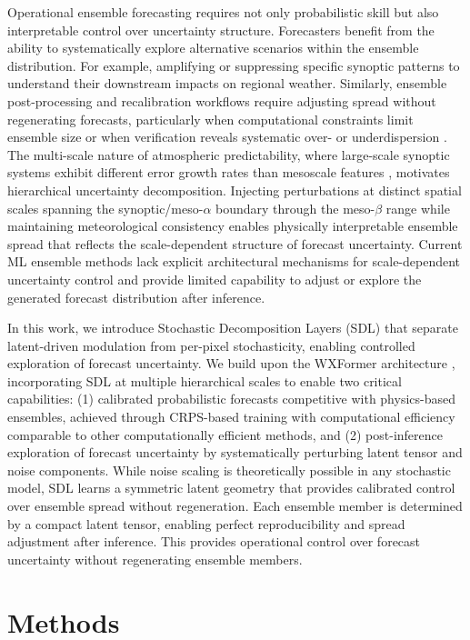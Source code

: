 \documentclass{agujournal2019}
\begin{document}
Operational ensemble forecasting requires not only probabilistic skill but also interpretable control over uncertainty structure. Forecasters benefit from the ability to systematically explore alternative scenarios within the ensemble distribution. For example, amplifying or suppressing specific synoptic patterns to understand their downstream impacts on regional weather. Similarly, ensemble post-processing and recalibration workflows require adjusting spread without regenerating forecasts, particularly when computational constraints limit ensemble size or when verification reveals systematic over- or underdispersion \cite{hamill1997verification, vannitsem2021statistical}. The multi-scale nature of atmospheric predictability, where large-scale synoptic systems exhibit different error growth rates than mesoscale features \cite{tribbia2004scale}, motivates hierarchical uncertainty decomposition. Injecting perturbations at distinct spatial scales spanning the synoptic/meso-$\alpha$ boundary through the meso-$\beta$ range while maintaining meteorological consistency enables physically interpretable ensemble spread that reflects the scale-dependent structure of forecast uncertainty. Current ML ensemble methods lack explicit architectural mechanisms for scale-dependent uncertainty control and provide limited capability to adjust or explore the generated forecast distribution after inference.

In this work, we introduce Stochastic Decomposition Layers (SDL) that separate latent-driven modulation from per-pixel stochasticity, enabling controlled exploration of forecast uncertainty. We build upon the WXFormer architecture \cite{schreck2025, chapman2025camulator}, incorporating SDL at multiple hierarchical scales to enable two critical capabilities: (1) calibrated probabilistic forecasts competitive with physics-based ensembles, achieved through CRPS-based training with computational efficiency comparable to other computationally efficient methods, and (2) post-inference exploration of forecast uncertainty by systematically perturbing latent tensor and noise components. While noise scaling is theoretically possible in any stochastic model, SDL learns a symmetric latent geometry that provides calibrated control over ensemble spread without regeneration. Each ensemble member is determined by a compact latent tensor, enabling perfect reproducibility and spread adjustment after inference. This provides operational control over forecast uncertainty without regenerating ensemble members.

\section{Methods}
\end{document}
